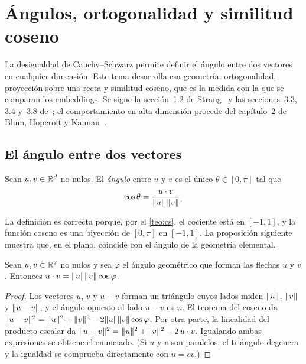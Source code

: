 \chapter{Ángulos, ortogonalidad y similitud coseno}
\label{tema:2}

La desigualdad de Cauchy--Schwarz permite definir el ángulo entre dos vectores en cualquier dimensión. Este tema desarrolla esa geometría: ortogonalidad, proyección sobre una recta y similitud coseno, que es la medida con la que se comparan los embeddings. Se sigue la sección~1.2 de Strang~\cite{strang} y las secciones~3.3, 3.4 y~3.8 de~\cite{mml}; el comportamiento en alta dimensión procede del capítulo~2 de Blum, Hopcroft y Kannan~\cite{bhk}.

\section{El ángulo entre dos vectores}

\begin{definicion}[Ángulo]\label{def:angulo}
Sean $u,v\in\mathbb{R}^{d}$ no nulos. El \emph{ángulo} entre $u$ y $v$ es el único $\theta\in[0,\pi]$ tal que
\[
\cos\theta=\frac{u\cdot v}{\lVert u\rVert\,\lVert v\rVert}.
\]
\end{definicion}

La definición es correcta porque, por el \cref{teo:cs}, el cociente está en $[-1,1]$, y la función coseno es una biyección de $[0,\pi]$ en $[-1,1]$. La proposición siguiente muestra que, en el plano, coincide con el ángulo de la geometría elemental.

\begin{proposicion}\label{prop:ley-coseno}
Sean $u,v\in\mathbb{R}^{2}$ no nulos y sea $\varphi$ el ángulo geométrico que forman las flechas $u$ y $v$. Entonces $u\cdot v=\lVert u\rVert\lVert v\rVert\cos\varphi$.
\end{proposicion}

\begin{proof}
Los vectores $u$, $v$ y $u-v$ forman un triángulo cuyos lados miden $\lVert u\rVert$, $\lVert v\rVert$ y $\lVert u-v\rVert$, y el ángulo opuesto al lado $u-v$ es $\varphi$. El teorema del coseno da $\lVert u-v\rVert^{2}=\lVert u\rVert^{2}+\lVert v\rVert^{2}-2\lVert u\rVert\lVert v\rVert\cos\varphi$. Por otra parte, la linealidad del producto escalar da $\lVert u-v\rVert^{2}=\lVert u\rVert^{2}+\lVert v\rVert^{2}-2\,u\cdot v$. Igualando ambas expresiones se obtiene el enunciado. (Si $u$ y $v$ son paralelos, el triángulo degenera y la igualdad se comprueba directamente con $u=cv$.)
\end{proof}

